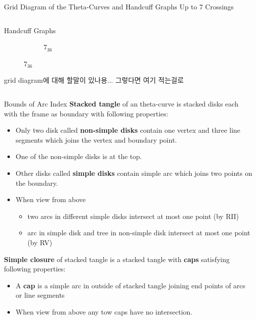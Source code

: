 \documentclass[final]{beamer}
\begin{document}
\begin{frame}[t]
\begin{alertblock}{Grid Diagram of the Theta-Curves and Handcuff Graphs Up to 7 Crossings}
\begin{columns}[t]
\begin{column}{0.5\textwidth}
\begin{alertblock}{Handcuff Graphs}
\begin{figure}
\begin{subfigure}{0.075\textwidth}
    \caption{$7_{36}$} 
    \end{subfigure}
  \end{figure}
  grid diagram에 대해 할말이 있나용... 그렇다면 여기 적는걸로
  \end{alertblock}
  \end{column}
  \end{columns}
  \end{alertblock}

\begin{columns}[t]
  \begin{block}{Bounds of Arc Index}
  \textbf{Stacked tangle} of an theta-curve is stacked disks each with the frame as boundary with following properties:
  \begin{itemize}
  \item Only two disk called \textbf{non-simple disks} contain one vertex and three line
  segments which joins the vertex and boundary point.
  \item One of the non-simple disks is at the top.
  \item Other disks called \textbf{simple disks} contain simple arc which joins two
  points on the boundary.
  \item When view from above
  \begin{itemize}
      \item two arcs in different simple disks intersect at most one point (by RII)
      \item arc in simple disk and tree in non-simple disk intersect at most one point (by RV)
  \end{itemize}
  \end{itemize}

  \textbf{Simple closure} of stacked tangle is a stacked tangle with \textbf{caps} satisfying following properties:
  \begin{itemize}
      \item A \textbf{cap} is a simple arc in outside of stacked tangle joining end points of arcs or line segments
      \item When view from above any tow caps have no intersection.
  \end{itemize}


\end{block}
\end{columns}
\end{frame}
\end{document}

